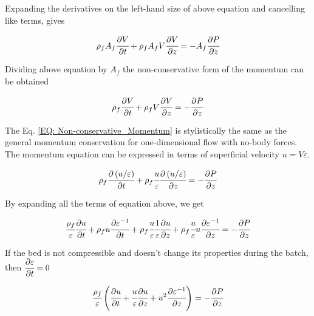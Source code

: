 \documentclass[../Article_Model_Parameters.tex]{subfiles}
\begin{document}
	Expanding the derivatives on the left-hand size of above equation and cancelling like terms, gives

	{\footnotesize
		\begin{equation}
			\rho_f A_f \cfrac{\partial V}{\partial t} + \rho_f A_f V \cfrac{\partial V}{\partial z} = -A_f \cfrac{\partial P}{\partial z}
		\end{equation}
	}

	Dividing above equation by $A_f$ the non-conservative form of the momentum can be obtained
	
	{\footnotesize
		\begin{equation}
			\rho_f \cfrac{\partial V}{\partial t} + \rho_f V \cfrac{\partial V}{\partial z} = -\cfrac{\partial P}{\partial z}
			\label{EQ: Non-conservative_Momentum}
		\end{equation}
	}

	The Eq. \ref{EQ: Non-conservative_Momentum} is stylistically the same as the general momentum conservation for one-dimensional flow with no-body forces. The momentum equation can be expressed in terms of superficial velocity $u=V\varepsilon$. 
	
	{\footnotesize
		\begin{equation}
			\rho_f \cfrac{\partial \left(u / \varepsilon \right)}{\partial t} + \rho_f \cfrac{u}{\varepsilon} \cfrac{\partial \left( u / \varepsilon \right)}{\partial z} = - \cfrac{\partial P}{\partial z}
		\end{equation}
	}

	By expanding all the terms of equation above, we get
	
	{\footnotesize
		\begin{equation}
			\cfrac{\rho_f}{\varepsilon} \cfrac{\partial u}{\partial t} + \rho_f u \cfrac{\partial \varepsilon^{-1}}{\partial t} + \rho_f \cfrac{u}{\varepsilon} \cfrac{1}{\varepsilon} \cfrac{\partial u}{\partial z} + \rho_f \cfrac{u}{\varepsilon} u \cfrac{\partial \varepsilon^{-1} }{\partial z} = - \cfrac{\partial P}{\partial z}
		\end{equation}
	}
	
	If the bed is not compressible and doesn't change its properties during the batch, then ${\footnotesize\cfrac{\partial \varepsilon}{\partial t}=0}$
	
	{\footnotesize
		\begin{equation}
			\cfrac{\rho_f}{\varepsilon} \left( \cfrac{\partial u}{\partial t} + \cfrac{u}{\varepsilon} \cfrac{\partial u}{\partial z} + u^2 \cfrac{\partial \varepsilon^{-1}}{\partial z} \right) = -\cfrac{\partial P}{\partial z}
		\end{equation}
	}
\end{document}
